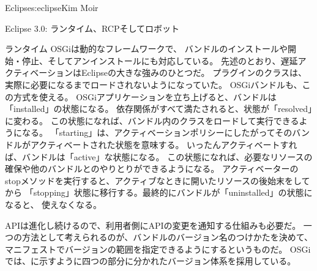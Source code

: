 \begin{aosachapter}{Eclipse}{s:eclipse}{Kim Moir}
\begin{aosasect1}{Eclipse 3.0: ランタイム、RCPそしてロボット}
\begin{aosasect2}{ランタイム}
OSGiは動的なフレームワークで、
バンドルのインストールや開始・停止、そしてアンインストールにも対応している。
先述のとおり、遅延アクティベーションはEclipseの大きな強みのひとつだ。
プラグインのクラスは、実際に必要になるまでロードされないようになっていた。
OSGiバンドルも、この方式を使える。
OSGiアプリケーションを立ち上げると、バンドルは「installed」の状態になる。
依存関係がすべて満たされると、状態が「resolved」に変わる。
この状態になれば、バンドル内のクラスをロードして実行できるようになる。
「starting」は、アクティベーションポリシーにしたがってそのバンドルがアクティベートされた状態を意味する。
いったんアクティベートすれば、バンドルは「active」な状態になる。
この状態になれば、必要なリソースの確保や他のバンドルとのやりとりができるようになる。
アクティベーターのstopメソッドを実行すると、アクティブなときに開いたリソースの後始末をしてから
「stopping」状態に移行する。最終的にバンドルが「uninstalled」の状態になると、
使えなくなる。

APIは進化し続けるので、利用者側にAPIの変更を通知する仕組みも必要だ。
一つの方法として考えられるのが、バンドルのバージョン名のつけかたを決めて、
マニフェストでバージョンの範囲を指定できるようにするというものだ。
OSGiでは、に示すように四つの部分に分かれたバージョン体系を採用している。


\end{aosasect2}
\end{aosasect1}
\end{aosachapter}

